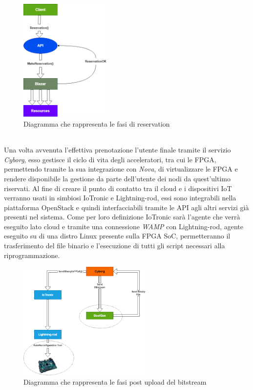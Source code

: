 \begin{figure}[h]
\centering
\includegraphics[width=0.4\textwidth]{images/Arch1.png}
\caption{Diagramma che rappresenta le fasi di reservation}
\end{figure}\\
Una volta avvenuta l'effettiva prenotazione l'utente finale tramite il servizio \textit{Cyborg}, esso gestisce il ciclo di vita degli acceleratori, tra cui le FPGA, permettendo tramite la sua integrazione con \textit{Nova}, di virtualizzare le FPGA e rendere disponibile la gestione da parte dell'utente dei nodi da quest'ultimo riservati. Al fine di creare il punto di contatto tra il cloud e i dispositivi IoT verranno usati in simbiosi IoTronic e Lightning-rod, essi sono integrabili nella piattaforma OpenStack e quindi interfacciabili tramite le API agli altri servizi già presenti nel sistema. Come per loro definizione IoTronic sarà l'agente che verrà eseguito lato cloud e tramite una connessione \textit{WAMP} con Lightning-rod, agente eseguito su di una distro Linux presente sulla FPGA SoC, permetteranno il trasferimento del file binario e l'esecuzione di tutti gli script necessari alla riprogrammazione.
\begin{figure}[h]
\centering
\includegraphics[width=0.6\textwidth]{images/Arch.png}
\caption{Diagramma che rappresenta le fasi post upload del bitstream}
\end{figure}\\
